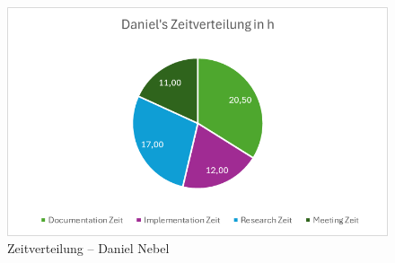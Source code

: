 \documentclass{article}
\begin{document}
\begin{figure}[H]
  \centering
  \includegraphics[width=\textwidth]{Daniel_Zeitverteilung.png}
  \caption{Zeitverteilung – Daniel Nebel}
  \label{fig:daniel-zeitverteilung}
\end{figure}
\end{document}
